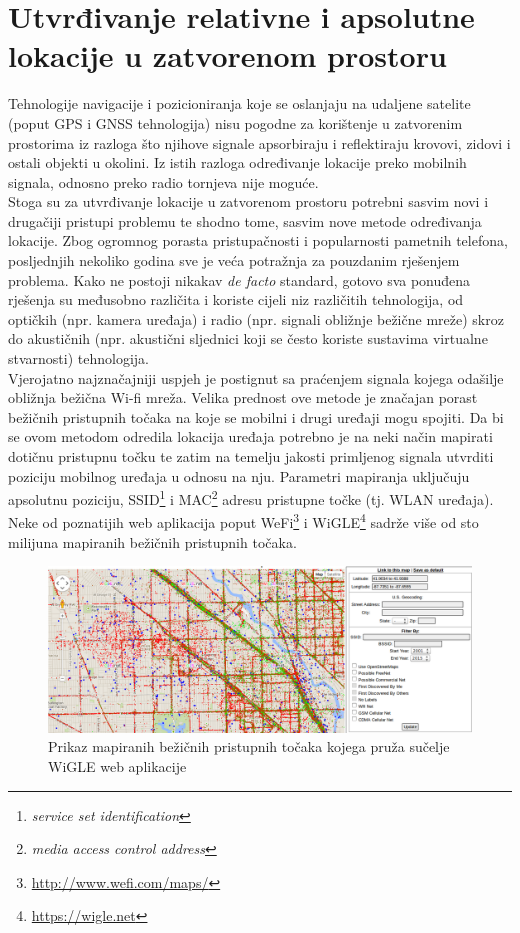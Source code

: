 \chapter{Utvrđivanje relativne i apsolutne lokacije u zatvorenom prostoru}

Tehnologije navigacije i pozicioniranja koje se oslanjaju na udaljene satelite (poput GPS i GNSS tehnologija) nisu pogodne za korištenje u zatvorenim prostorima iz razloga što njihove signale apsorbiraju i reflektiraju krovovi, zidovi i ostali objekti u okolini. 
Iz istih razloga određivanje lokacije preko mobilnih signala, odnosno preko radio tornjeva nije moguće. 
\\
Stoga su za utvrđivanje lokacije u zatvorenom prostoru potrebni sasvim novi i drugačiji pristupi problemu te shodno tome, sasvim nove metode određivanja lokacije. 
Zbog ogromnog porasta pristupačnosti i popularnosti pametnih telefona, posljednjih nekoliko godina sve je veća potražnja za pouzdanim rješenjem problema. 
Kako ne postoji nikakav \textit{de facto} standard, gotovo sva ponuđena rješenja su međusobno različita i koriste cijeli niz različitih tehnologija, od optičkih (npr. kamera uređaja) i radio (npr. signali obližnje bežične mreže) skroz do akustičnih (npr. akustični sljednici koji se često koriste sustavima virtualne stvarnosti) tehnologija.
\\

Vjerojatno najznačajniji uspjeh je postignut sa praćenjem signala kojega odašilje obližnja bežična Wi-fi mreža. 
Velika prednost ove metode je značajan porast bežičnih pristupnih točaka na koje se mobilni i drugi uređaji mogu spojiti. 
Da bi se ovom metodom odredila lokacija uređaja potrebno je na neki način mapirati dotičnu pristupnu točku te zatim na temelju jakosti primljenog signala utvrditi poziciju mobilnog uređaja u odnosu na nju. 
Parametri mapiranja uključuju apsolutnu poziciju, SSID\footnote{\textit{service set identification}} i MAC\footnote{\textit{media access control address}} adresu pristupne točke (tj. WLAN uređaja). 
Neke od poznatijih web aplikacija poput WeFi\footnote{\url{http://www.wefi.com/maps/}} i WiGLE\footnote{\url{https://wigle.net}} sadrže više od sto milijuna mapiranih bežičnih pristupnih točaka. 
\\

\begin{figure}
    \centering
    \includegraphics[scale=0.3]{pictures/WiGLE}
    \caption{Prikaz mapiranih bežičnih pristupnih točaka kojega pruža sučelje WiGLE web aplikacije}
\end{figure}


